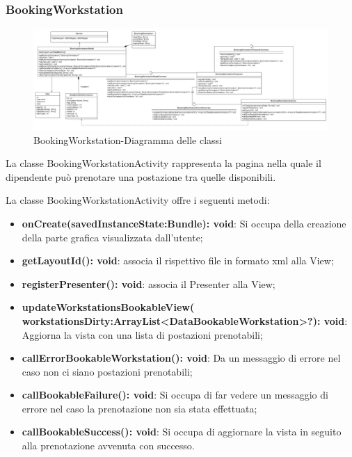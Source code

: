 \subsubsection{BookingWorkstation}
\begin{figure}[H]
	\centering
	\includegraphics[width=16cm]{res/images/BookingWorkstation.png}
	\caption{BookingWorkstation-Diagramma delle classi}
	\label{fig:BookingWorkstation-Diagramma delle classi}
\end{figure}
La classe BookingWorkstationActivity rappresenta la pagina nella quale il dipendente può prenotare una postazione tra quelle disponibili.

La classe BookingWorkstationActivity offre i seguenti metodi:
\begin{itemize}
	\item \textbf{onCreate(savedInstanceState:Bundle): void}: Si occupa della creazione della parte grafica visualizzata dall'utente; 
	\item \textbf{getLayoutId(): void}: associa il rispettivo file in formato xml alla View;
	\item \textbf{registerPresenter(): void}: associa il Presenter alla View; 
	\item \textbf{updateWorkstationsBookableView( workstationsDirty:ArrayList<DataBookableWorkstation>?): void}: Aggiorna la vista con una lista di postazioni prenotabili; 
	\item \textbf{callErrorBookableWorkstation(): void}: Da un messaggio di errore nel caso non ci siano postazioni prenotabili;
	\item \textbf{callBookableFailure(): void}: Si occupa di far vedere un messaggio di errore nel caso la prenotazione non sia stata effettuata; 
	\item \textbf{callBookableSuccess(): void}: Si occupa di aggiornare la vista in seguito alla prenotazione avvenuta con successo.
\end{itemize}

